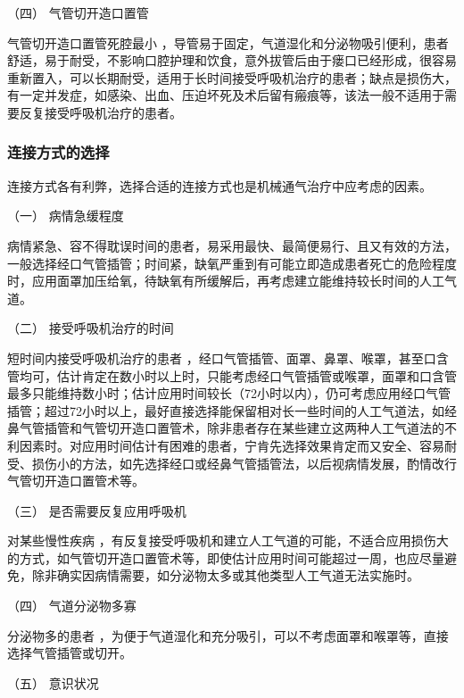 \hypertarget{text00369.htmlux5cux23CHP16-3-3-1-4}{}
（四） 气管切开造口置管

气管切开造口置管死腔最小
，导管易于固定，气道湿化和分泌物吸引便利，患者舒适，易于耐受，不影响口腔护理和饮食，意外拔管后由于瘘口已经形成，很容易重新置入，可以长期耐受，适用于长时间接受呼吸机治疗的患者；缺点是损伤大，有一定并发症，如感染、出血、压迫坏死及术后留有瘢痕等，该法一般不适用于需要反复接受呼吸机治疗的患者。

\subsubsection{连接方式的选择}

连接方式各有利弊，选择合适的连接方式也是机械通气治疗中应考虑的因素。

\hypertarget{text00369.htmlux5cux23CHP16-3-3-2-1}{}
（一） 病情急缓程度

病情紧急、容不得耽误时间的患者，易采用最快、最简便易行、且又有效的方法，一般选择经口气管插管；时间紧，缺氧严重到有可能立即造成患者死亡的危险程度时，应用面罩加压给氧，待缺氧有所缓解后，再考虑建立能维持较长时间的人工气道。

\hypertarget{text00369.htmlux5cux23CHP16-3-3-2-2}{}
（二） 接受呼吸机治疗的时间

短时间内接受呼吸机治疗的患者
，经口气管插管、面罩、鼻罩、喉罩，甚至口含管均可，估计肯定在数小时以上时，只能考虑经口气管插管或喉罩，面罩和口含管最多只能维持数小时；估计应用时间较长（72小时以内），仍可考虑应用经口气管插管；超过72小时以上，最好直接选择能保留相对长一些时间的人工气道法，如经鼻气管插管和气管切开造口置管术，除非患者存在某些建立这两种人工气道法的不利因素时。对应用时间估计有困难的患者，宁肯先选择效果肯定而又安全、容易耐受、损伤小的方法，如先选择经口或经鼻气管插管法，以后视病情发展，酌情改行气管切开造口置管术等。

\hypertarget{text00369.htmlux5cux23CHP16-3-3-2-3}{}
（三） 是否需要反复应用呼吸机

对某些慢性疾病
，有反复接受呼吸机和建立人工气道的可能，不适合应用损伤大的方式，如气管切开造口置管术等，即使估计应用时间可能超过一周，也应尽量避免，除非确实因病情需要，如分泌物太多或其他类型人工气道无法实施时。

\hypertarget{text00369.htmlux5cux23CHP16-3-3-2-4}{}
（四） 气道分泌物多寡

分泌物多的患者
，为便于气道湿化和充分吸引，可以不考虑面罩和喉罩等，直接选择气管插管或切开。

\hypertarget{text00369.htmlux5cux23CHP16-3-3-2-5}{}
（五） 意识状况

